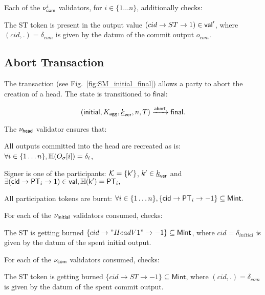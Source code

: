 \noindent Each of the $\nu_\mathsf{com}^i$ validators, for $i \in \{ 1\dots n\}$, additionally checks:
\begin{menumerate}
    \item The ST token is present in the output value $(cid \rightarrow ST \rightarrow 1) \in \mathsf{val}'$, where $(cid,.) = \delta_{com}$ is given by the datum of the commit output $o_{com}$.
\end{menumerate}

\subsection{Abort Transaction}\label{sec:abort-tx} 




The \mtxAbort{} transaction
(see Fig.~\ref{fig:SM_initial_final}) allows a party to abort the
creation of a head.  The state is transitioned to $\mathsf{final}$:

$$
   (\mathsf{initial},K_{\mathsf{agg}},\underline{k}_{\mathsf{ver}},n,T) \xrightarrow{\mathsf{abort}} \mathsf{final}.
$$

\noindent The $\nu_\mathsf{head}$ validator ensures that:
\begin{menumerate}
 \item All outputs committed into the head are recreated as is: $\forall i \in \{1\dots n\}, \mathbb{H}(O_\sigma[i]) = \delta_i$,
  \item Signer is one of the participants: $\mathcal K = \{\mathsf{k'}\}$, $k' \in \underline{k}_{\mathsf{ver}}$ and
    $
    \exists (\mathsf{cid} \rightarrow \mathsf{PT}_i \rightarrow 1) \in \mathsf{val}, \mathbb{H}(\mathsf{k'}) = \mathsf{PT}_i,
    $
 \item All participation tokens are burnt: $\forall i \in \{1\dots n\}, \{\mathsf{cid} \rightarrow \mathsf{PT}_i \rightarrow -1\} \subseteq \mathsf{Mint}.$
\end{menumerate} 

\noindent For each of the $\nu_\mathsf{initial}$ validators consumed, checks:
\begin{menumerate}
  \item The ST is getting burned
  $\{cid \rightarrow "HeadV1" \rightarrow -1\} \subseteq \mathsf{Mint}$, where
  $cid = \delta_{initial}$ is given by the datum of the spent initial output.
\end{menumerate}

\noindent For each of the $\nu_\mathsf{com}$ validators consumed, checks:
\begin{menumerate}
  \item The ST token is getting burned
  $\{cid \rightarrow ST \rightarrow -1\} \subseteq \mathsf{Mint}$, where
  $(cid,.) = \delta_{com}$ is given by the datum of the spent commit output.
\end{menumerate}

